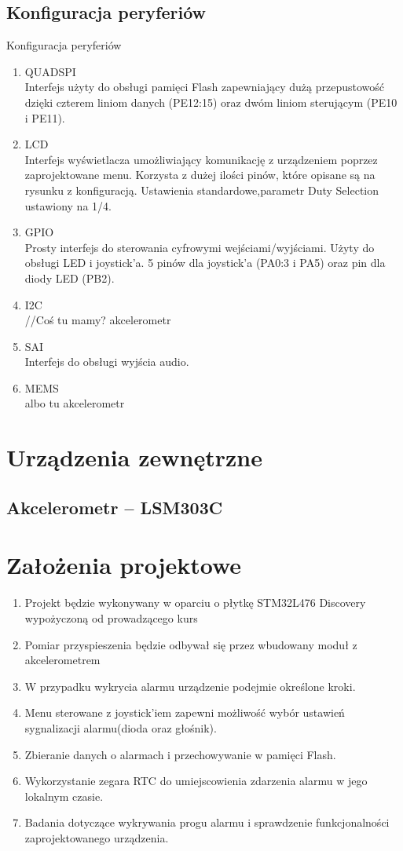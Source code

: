 \documentclass[10pt, a4paper]{article}
\begin{document}
\subsection{Konfiguracja peryferiów}
Konfiguracja peryferiów
\begin{enumerate}
\item QUADSPI\\
Interfejs użyty do obsługi pamięci Flash zapewniający dużą przepustowość dzięki czterem liniom danych (PE12:15) oraz dwóm liniom sterującym (PE10 i PE11).
\item LCD\\
Interfejs wyświetlacza umożliwiający komunikację z urządzeniem poprzez zaprojektowane menu. Korzysta z dużej ilości pinów, które opisane są na rysunku z konfiguracją. Ustawienia standardowe,parametr Duty Selection ustawiony na 1/4.
\item GPIO \\
Prosty interfejs do sterowania cyfrowymi wejściami/wyjściami. Użyty do obsługi LED i joystick'a. 5 pinów dla joystick'a (PA0:3 i PA5) oraz pin dla diody LED (PB2).
\item I2C\\
//Coś tu mamy? akcelerometr
\item SAI\\
Interfejs do obsługi wyjścia audio.
\item MEMS\\
albo tu akcelerometr
\end{enumerate}

\section{Urządzenia zewnętrzne}
\subsection{Akcelerometr -- LSM303C}

\section{Założenia projektowe}
\begin{enumerate}
\item Projekt będzie wykonywany w oparciu o płytkę STM32L476 Discovery wypożyczoną od prowadzącego kurs
\item Pomiar przyspieszenia będzie odbywał się przez wbudowany moduł z akcelerometrem
\item W przypadku wykrycia alarmu urządzenie podejmie określone kroki.
\item Menu sterowane z joystick'iem zapewni możliwość wybór ustawień sygnalizacji alarmu(dioda oraz głośnik).
\item Zbieranie danych o alarmach i przechowywanie w pamięci Flash.
\item Wykorzystanie zegara RTC do umiejscowienia zdarzenia alarmu w jego lokalnym czasie.
\item Badania dotyczące wykrywania progu alarmu i sprawdzenie funkcjonalności zaprojektowanego urządzenia.

\end{enumerate}
\end{document}
